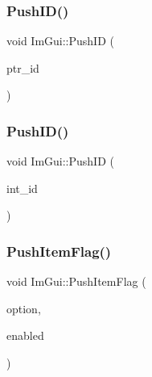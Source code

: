 \mbox{\label{namespace_im_gui_af9cf42fdf2fbc5eeec7521de14996bfb}} 
\subsubsection{\texorpdfstring{Push\+I\+D()}{PushID()}\hspace{0.1cm}{\footnotesize\ttfamily [3/4]}}
{\footnotesize\ttfamily void Im\+Gui\+::\+Push\+ID (\begin{DoxyParamCaption}\item[{const void $\ast$}]{ptr\+\_\+id }\end{DoxyParamCaption})}

\mbox{\label{namespace_im_gui_a6a11664be2a0b9a0e7054bb339e009ac}} 
\subsubsection{\texorpdfstring{Push\+I\+D()}{PushID()}\hspace{0.1cm}{\footnotesize\ttfamily [4/4]}}
{\footnotesize\ttfamily void Im\+Gui\+::\+Push\+ID (\begin{DoxyParamCaption}\item[{int}]{int\+\_\+id }\end{DoxyParamCaption})}

\mbox{\label{namespace_im_gui_ac7301f6378333f6d17f47823eed9e00a}} 
\subsubsection{\texorpdfstring{Push\+Item\+Flag()}{PushItemFlag()}}
{\footnotesize\ttfamily void Im\+Gui\+::\+Push\+Item\+Flag (\begin{DoxyParamCaption}\item[{\mbox{\hyperlink{imgui__internal_8h_abcf9eafab4557e911b2c0d8fe2feeb38}{Im\+Gui\+Item\+Flags}}}]{option,  }\item[{bool}]{enabled }\end{DoxyParamCaption})}

\mbox{\label{namespace_im_gui_a4ad13bf38f0521a339133248ef3e3036}} 
